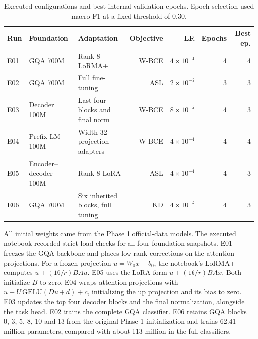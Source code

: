 \begin{table}[htbp]
\centering\small
\caption{Executed configurations and best internal validation epochs.
Epoch selection used macro-F1 at a fixed threshold of 0.30.}
\label{tab:p5-models}
\begin{tabularx}{\linewidth}{ll>{\raggedright\arraybackslash}Xrrrr}
\toprule
Run & Foundation & Adaptation & Objective & LR & Epochs & Best ep. \\
\midrule
E01 & GQA 700M & Rank-8 LoRMA+ & W-BCE & \(4{\times}10^{-4}\) & 4 & 4 \\
E02 & GQA 700M & Full fine-tuning & ASL & \(2{\times}10^{-5}\) & 3 & 3 \\
E03 & Decoder 100M & Last four blocks and final norm & W-BCE & \(8{\times}10^{-5}\) & 4 & 3 \\
E04 & Prefix-LM 100M & Width-32 projection adapters & W-BCE & \(4{\times}10^{-4}\) & 4 & 4 \\
E05 & Encoder--decoder 100M & Rank-8 LoRA & ASL & \(4{\times}10^{-4}\) & 4 & 3 \\
E06 & GQA 700M & Six inherited blocks, full tuning & KD & \(4{\times}10^{-5}\) & 4 & 3 \\
\bottomrule
\end{tabularx}
\end{table}

All initial weights came from the Phase 1 official-data models.
The executed notebook recorded strict-load checks for all four foundation
snapshots. E01 freezes the GQA backbone and places low-rank corrections on
the attention projections. For a frozen projection \(u=W_0x+b_0\), the
notebook's LoRMA+ computes \(u+(16/r)BAu\). E05 uses the LoRA form
\(u+(16/r)BAx\). Both initialize \(B\) to zero. E04 wraps attention
projections with \(u+U\,\mathrm{GELU}(Du+d)+c\), initializing the up projection
and its bias to zero. E03 updates the top four decoder blocks and the final
normalization, alongside the task head. E02 trains the complete GQA
classifier. E06 retains GQA blocks 0, 3, 5, 8, 10 and 13 from the original
Phase 1 initialization and trains 62.41 million parameters, compared with
about 113 million in the full classifiers.

